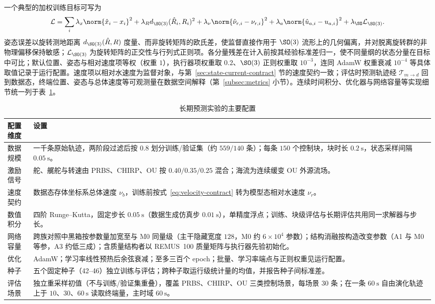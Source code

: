 一个典型的加权训练目标可写为
\begin{equation}
  \mathcal{L}
  =
  \sum_i
  \lambda_x\norm{\hat x_i-x_i}^2
  +\lambda_R d_{\SO(3)}(\hat R_i,R_i)^2
  +\lambda_\nu\norm{\hat\nu_{r,i}-\nu_{r,i}}^2
  +\lambda_a\norm{\hat u_{a,i}-u_{a,i}}^2
  +\lambda_{\SO}\mathcal{L}_{\SO(3)} .
  \label{eq:training-loss}
\end{equation}
姿态误差以旋转测地距离 \(d_{\SO(3)}(\hat R,R)\) 度量、而非旋转矩阵的欧氏差，使监督直接作用于 \(\SO(3)\) 流形上的几何偏离，并对脱离旋转群的非物理偏移保持敏感；\(\mathcal{L}_{\SO(3)}\) 为旋转矩阵的正交性与行列式正则项。各分量残差在计入前按其经验标准差归一，使不同量纲的状态分量在目标中可比；默认位置、姿态与相对速度项等权（权重 \(1\)），执行器项权重取 \(0.2\)、\(\SO(3)\) 正则权重取 \(10^{-3}\)，连同 AdamW 权重衰减 \(10^{-4}\) 等具体取值记录于运行配置。速度项以相对水速度为监督对象，与第~\ref{sec:state-current-contract} 节的速度契约一致；评估时预测轨迹经 \(\mathcal{T}_{m\to d}\) 回到数据态，终端位置、姿态与总体速度等可观测量在数据空间解释（第~\ref{subsec:metrics} 小节）。连续时间积分、优化器与网络容量等实现细节统一列于表~\ref{tab:experimental-config}。

\begin{table}[htbp]
  \centering
  \caption{长期预测实验的主要配置}
  \label{tab:experimental-config}
  \begin{tabularx}{\textwidth}{>{\raggedright\arraybackslash}p{}>{\raggedright\arraybackslash}X}
    \toprule
    配置维度 & 设置 \\
    \midrule
    数据规模 & 一千条原始轨迹，两阶段过滤后按 \(0.8\) 划分训练/验证集（约 \(559/140\) 条）；每条 \(150\) 个控制块，块时长 \(0.2~\mathrm{s}\)，状态采样间隔 \(0.05~\mathrm{s}\)。 \\
    激励信号 & 舵、艉舵与转速由 PRBS、CHIRP、OU 按 \(0.40/0.35/0.25\) 混合；海流为连续缓变 OU 外源流场。 \\
    速度契约 & 数据态存体坐标系总体速度 \(\nu_b\)，训练前按式~\eqref{eq:velocity-contract} 转为模型态相对水速度 \(\nu_r\)。 \\
    数值积分 & 四阶 Runge--Kutta，固定步长 \(0.05~\mathrm{s}\)（数据生成仿真步 \(0.01~\mathrm{s}\)），单精度浮点；训练、块级评估与长期评估共用同一求解器与步长。 \\
    网络容量 & 跨族对照中黑箱按参数量加宽至与 M0 同量级（主干隐藏宽度 \(128\)，M0 约 \(6\times10^4\) 参数）；结构消融按构造改变参数（A1 与 M0 等参，A3 约低三成）；含质量结构者以 REMUS~100 质量矩阵与执行器先验初始化。 \\
    优化 & AdamW；学习率线性预热后余弦衰减；至多三百个 epoch；批量、学习率端点与正则权重见运行配置。 \\
    种子 & 五个固定种子（42--46）独立训练与评估；跨种子取运行级统计量的均值，并报告种子间标准差。 \\
    评估场景 & 独立重采样初值（不与训练/验证集重叠），覆盖 PRBS、CHIRP、OU 三类控制场景，每场景 \(30\) 条；在一条 \(60~\mathrm{s}\) 自由演化轨迹上于 \(10\)、\(30\)、\(60~\mathrm{s}\) 读取终端量，主时域 \(60~\mathrm{s}\)。 \\
    \bottomrule
  \end{tabularx}
\end{table}

